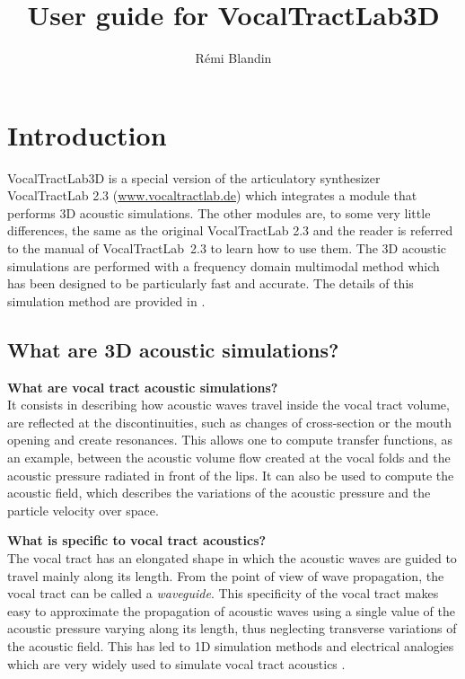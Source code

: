 \documentclass[]{article}
\title{User guide for VocalTractLab3D}
\author{R{\'e}mi Blandin}
\begin{document}
	
	\lstset{ 
		language=Matlab, 
		tabsize=2, 
		showspaces=false, 
		showstringspaces=false, 
		float=[htb], 
		captionpos=b, 
		basicstyle=\footnotesize, 
		frame=tbrl, %
		frameround=tttt, 
		numbers=left, 
		numberstyle=\tiny, 
		numberblanklines=false, 
	} 
	
	
	\maketitle
	
	\tableofcontents
	
	\section{Introduction}
	
	VocalTractLab3D is a special version of the articulatory synthesizer
	VocalTractLab 2.3 \cite{birkholz2013modeling} (\url{www.vocaltractlab.de})
	which integrates a module that performs 3D acoustic simulations. The other modules are, to some very little differences, the same as the original VocalTractLab 2.3 
	and the reader is referred to the manual of VocalTractLab~2.3 to learn
	how to use them.
	The 3D acoustic simulations are performed with a frequency domain
	multimodal method which has been designed to be particularly 
	fast and accurate. The details of this simulation method are 
	provided in \textcite{blandin2022efficient}.
	
	\subsection{What are 3D acoustic simulations?}
	
	\textbf{What are vocal tract acoustic simulations?}\\ 
	It consists in describing how acoustic waves travel
	inside the vocal tract volume, are reflected at the discontinuities, such as 
	changes of cross-section or the mouth opening and create resonances. 
	This allows one to compute transfer functions, as an example, between the acoustic volume flow created at the vocal folds and the acoustic pressure radiated in front of the lips. It can also be used to 
	compute the acoustic field, which describes the variations of the  
	acoustic pressure and the particle velocity over space.
	
	\textbf{What is specific to vocal tract acoustics?}\\
	The vocal tract has an elongated shape in which the acoustic waves 
	are guided to travel mainly along its length. From the point
	of view of wave propagation, the vocal tract can be called a 
	\emph{waveguide}.
	This specificity of the vocal tract makes easy to approximate the 
	propagation of acoustic waves using a single value of the acoustic 
	pressure varying along its length, thus neglecting transverse 
	variations of the acoustic field. This has led to 1D simulation 
	methods and electrical analogies which are very widely used to 
	simulate vocal tract acoustics \cite{sondhi1987hybrid}.
	
\end{document}
